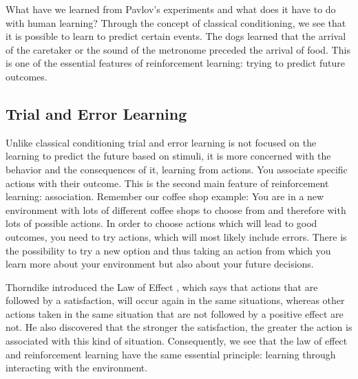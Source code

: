 What have we learned from Pavlov's experiments and what does it have to do with human learning? Through the concept of classical conditioning, we see that it is possible to learn to predict certain events. The dogs learned that the arrival of the caretaker or the sound of the metronome preceded the arrival of food. This is one of the essential features of reinforcement learning: trying to predict future outcomes.

\subsection{Trial and Error Learning}
Unlike classical conditioning trial and error learning is not focused on the learning to predict the future based on stimuli, it is more concerned with the behavior and the consequences of it, learning from actions. You associate specific actions with their outcome. This is the second main feature of reinforcement learning: association. 
Remember our coffee shop example: You are in a new environment with lots of different coffee shops to choose from and therefore with lots of possible actions. 
In order to choose actions which will lead to good outcomes, you need to try actions, which will most likely include errors.
There is the possibility to try a new option and thus taking an action from which you learn more about your environment but also about your future decisions. 

Thorndike introduced the Law of Effect \citep{thorndike1927law}, which says that actions that are followed by a satisfaction, will occur again in the same situations, whereas other actions taken in the same situation that are not followed by a positive effect are not. He also discovered that the stronger the satisfaction, the greater the action is associated with this kind of situation. Consequently, we see that the law of effect and reinforcement learning have the same essential principle: learning through interacting with the environment.

